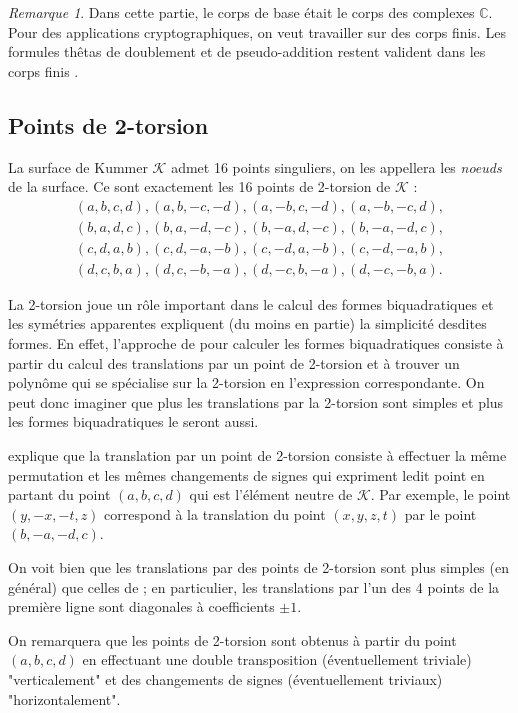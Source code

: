 \documentclass[a4paper,12pt]{article}
\theoremstyle{definition}
\theoremstyle{remark}
\newtheorem{remarque}{Remarque}
\numberwithin{equation}{section}
\begin{document}
\begin{remarque}
Dans cette partie, le corps de base était le corps des complexes $\mathbb{C}$. Pour des applications cryptographiques, on veut travailler sur des corps finis. Les formules thêtas de doublement et de pseudo-addition restent valident dans les corps finis \citep{gaudry}.
\end{remarque}

\subsection{Points de 2-torsion}

La surface de Kummer $\mathcal{K}$ admet 16 points singuliers, on les appellera les \emph{noeuds} de la surface. Ce sont exactement les 16 points de 2-torsion de $\mathcal{K}$ :
\begin{align*}
   &(a,b,c,d),(a,b,-c,-d),(a,-b,c,-d),(a,-b,-c,d),& \\
   &(b,a,d,c),(b,a,-d,-c),(b,-a,d,-c),(b,-a,-d,c),& \\
   &(c,d,a,b),(c,d,-a,-b),(c,-d,a,-b),(c,-d,-a,b),& \\
   &(d,c,b,a),(d,c,-b,-a),(d,-c,b,-a),(d,-c,-b,a).&
\end{align*}

La 2-torsion joue un rôle important dans le calcul des formes biquadratiques et les symétries apparentes expliquent (du moins en partie) la simplicité desdites formes. 
En effet, l'approche de \citet{cassels-Flynn} pour calculer les formes biquadratiques consiste à partir du calcul des translations par un point de 2-torsion et à trouver un polynôme qui se spécialise sur la 2-torsion en l'expression correspondante.
On peut donc imaginer que plus les translations par la 2-torsion sont simples et plus les formes biquadratiques le seront aussi.

\citet{gaudry} explique que la translation par un point de 2-torsion consiste à effectuer la même permutation et les mêmes changements de signes qui expriment ledit point en partant du point $(a,b,c,d)$ qui est l'élément neutre de $\mathcal{K}$. Par exemple, le point $(y,-x,-t,z)$ correspond à la translation du point $(x,y,z,t)$ par le point $(b,-a,-d,c)$.

On voit bien que les translations par des points de 2-torsion sont plus simples (en général) que celles de \citet{eqKum}; en particulier, les translations par l'un des 4 points de la première ligne sont diagonales à coefficients $\pm 1$.

On remarquera que les points de 2-torsion sont obtenus à partir du point $(a,b,c,d)$ en effectuant une double transposition (éventuellement triviale) "verticalement" et des changements de signes (éventuellement triviaux) "horizontalement".
\end{document}
